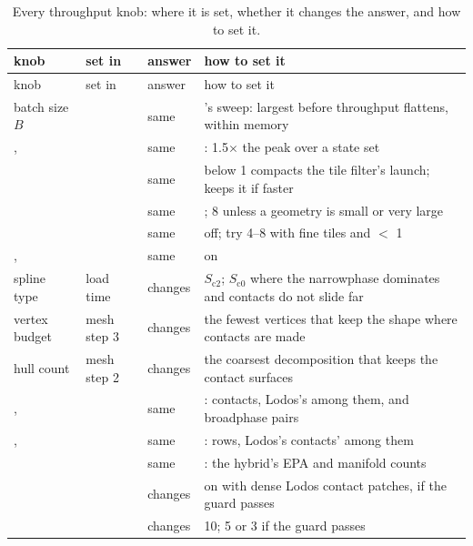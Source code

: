 \begin{longtable}{@{}L{30mm}L{17mm}L{14mm}L{84mm}@{}}
\caption{Every throughput knob: where it is set, whether it changes the answer, and how to set it.}\label{tab:glance}\\
\toprule
knob & set in & answer & how to set it \\
\midrule
\endfirsthead
\toprule
knob & set in & answer & how to set it \\
\midrule
\endhead
batch size $B$ &  & same & 's sweep: largest before throughput flattens, within memory \\
,  &  & same & : 1.5$\times$ the peak over a state set \\
 &  & same & below 1 compacts the tile filter's launch;  keeps it if faster \\
 &  & same & ; 8 unless a geometry is small or very large \\
 &  & same & off; try 4--8 with fine tiles and  $<$ 1 \\
,  &  & same & on \\
spline type & load time & changes & $S_{\mathrm{c2}}$; $S_{\mathrm{c0}}$ where the narrowphase dominates and contacts do not slide far \\
vertex budget & mesh step 3 & changes & the fewest vertices that keep the shape where contacts are made \\
hull count & mesh step 2 & changes & the coarsest decomposition that keeps the contact surfaces \\
,  &  & same & : contacts, Lodos's among them, and broadphase pairs \\
,  &  & same & : rows, Lodos's contacts' among them \\
 &  & same & : the hybrid's EPA and manifold counts \\
 &  & changes & on with dense Lodos contact patches, if the guard passes \\
 &  & changes & 10; 5 or 3 if the guard passes \\

\end{longtable}
